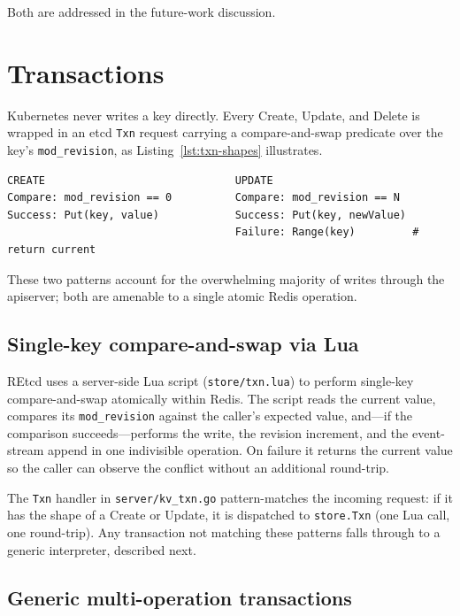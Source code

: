 Both are addressed in the future-work discussion.

\section{Transactions}
\label{sec:design-txn}

Kubernetes never writes a key directly. Every Create, Update, and Delete is wrapped in an etcd \texttt{Txn} request carrying a compare-and-swap predicate over the key's \texttt{mod\_revision}, as Listing~\ref{lst:txn-shapes} illustrates.

\begin{lstlisting}[caption={The two transaction shapes Kubernetes emits.},label=lst:txn-shapes]
CREATE                              UPDATE
Compare: mod_revision == 0          Compare: mod_revision == N
Success: Put(key, value)            Success: Put(key, newValue)
                                    Failure: Range(key)         # return current
\end{lstlisting}

These two patterns account for the overwhelming majority of writes through the apiserver; both are amenable to a single atomic Redis operation.

\subsection{Single-key compare-and-swap via Lua}
\label{sec:design-txn-lua}

REtcd uses a server-side Lua script (\texttt{store/txn.lua}) to perform single-key compare-and-swap atomically within Redis. The script reads the current value, compares its \texttt{mod\_revision} against the caller's expected value, and---if the comparison succeeds---performs the write, the revision increment, and the event-stream append in one indivisible operation. On failure it returns the current value so the caller can observe the conflict without an additional round-trip.

The \texttt{Txn} handler in \texttt{server/kv\_txn.go} pattern-matches the incoming request: if it has the shape of a Create or Update, it is dispatched to \texttt{store.Txn} (one Lua call, one round-trip). Any transaction not matching these patterns falls through to a generic interpreter, described next.

\subsection{Generic multi-operation transactions}
\label{sec:design-txn-generic}

